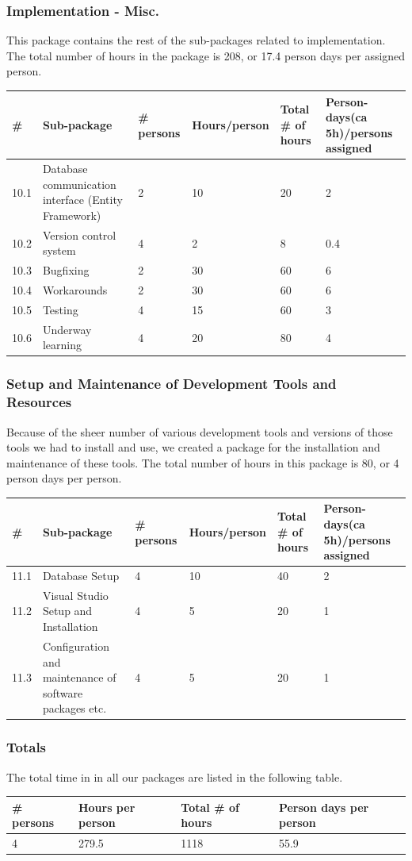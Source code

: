 \subsubsection{Implementation - Misc.}
This package contains the rest of the sub-packages related to implementation. The total number of hours in the package is 208, or 17.4 person days per assigned person.
\begin{longtable}{|p{0.7cm}|p{3cm}|p{1.8cm}|p{2.5cm}|p{2cm}|p{2.8cm}|}
\hline
\# & Sub-package & \# persons & Hours/person & Total \# of hours & Person-days(ca 5h)/persons assigned\\ 
\hline
10.1 & Database communication interface (Entity Framework) & 2 & 10 & 20 & 2\\ 
\hline
10.2 & Version control system & 4 & 2 & 8 & 0.4\\ 
\hline
10.3 & Bugfixing & 2 & 30 & 60 & 6\\ 
\hline
10.4 & Workarounds & 2 & 30 & 60 & 6\\ 
\hline
10.5 & Testing & 4 & 15 & 60 & 3\\ 
\hline
10.6 & Underway learning & 4 & 20 & 80 & 4\\ 
\hline
\end{longtable}

\subsubsection{Setup and Maintenance of Development Tools and Resources}
Because of the sheer number of various development tools and versions of those tools we had to install and use, we created a package for the installation and maintenance of these tools. The total number of hours in this package is 80, or 4 person days per person.
\begin{longtable}{|p{0.7cm}|p{3cm}|p{1.8cm}|p{2.5cm}|p{2cm}|p{2.8cm}|}
\hline
\# & Sub-package & \# persons & Hours/person & Total \# of hours & Person-days(ca 5h)/persons assigned\\ 
\hline
11.1 & Database Setup & 4 & 10 & 40 & 2\\ 
\hline
11.2 & Visual Studio Setup and Installation & 4 & 5 & 20 & 1\\ 
\hline
11.3 & Configuration and maintenance of software packages etc. & 4 & 5 & 20 & 1\\ 
\hline
\end{longtable}

\subsubsection{Totals}
The total time in in all our packages are listed in the following table.
\begin{longtable}{|p{2cm}|p{3cm}|p{3cm}|p{4.5cm}|}
\hline
\# persons & Hours per person & Total \# of hours & Person days per person\\ 
\hline
4 & 279.5 & 1118 & 55.9\\ 
 \hline
\end{longtable}

